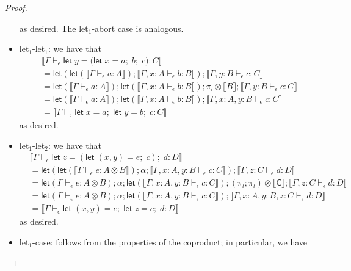 \documentclass[acmsmall,screen,review]{acmart}
\newcommand{\ms}[1]{\ensuremath{\mathsf{#1}}}
\newcommand{\letexpr}[3]{\ensuremath{\ms{let}\;#1 = #2;\;#3}}
\newcommand{\bhyp}[2]{#1 : #2}
\newcommand{\hasty}[4]{#1 \vdash_{#2} #3: {#4}}
\newcommand{\brle}[1]{{\textsf{#1}}}
\newcommand{\dnt}[1]{\llbracket{#1}\rrbracket}
\newcommand{\lmor}[1]{\ms{let}(#1)}
\begin{document}
\begin{proof}
\begin{itemize}[leftmargin=*]
    as desired. The \brle{let$_1$-abort} case is analogous.
    \item \brle{let$_1$-let$_1$}: we have that
    \begin{align*}
      & \dnt{\hasty{\Gamma}{\epsilon}{\letexpr{y}{(\letexpr{x}{a}{b}}{c})}{C}} \\
      & = \lmor{\lmor{\dnt{\hasty{\Gamma}{\epsilon}{a}{A}}} 
        ; \dnt{\hasty{\Gamma, \bhyp{x}{A}}{\epsilon}{b}{B}}}
        ; \dnt{\hasty{\Gamma, \bhyp{y}{B}}{\epsilon}{c}{C}} \\
      & = \lmor{\dnt{\hasty{\Gamma}{\epsilon}{a}{A}}}
        ; \lmor{\dnt{\hasty{\Gamma, \bhyp{x}{A}}{\epsilon}{b}{B}}}
        ; \pi_l \otimes \dnt{B}
        ; \dnt{\hasty{\Gamma, \bhyp{y}{B}}{\epsilon}{c}{C}} \\
      & = \lmor{\dnt{\hasty{\Gamma}{\epsilon}{a}{A}}}
      ; \lmor{\dnt{\hasty{\Gamma, \bhyp{x}{A}}{\epsilon}{b}{B}}}
      ; \dnt{\hasty{\Gamma, \bhyp{x}{A}, \bhyp{y}{B}}{\epsilon}{c}{C}} \\
      & = \dnt{\hasty{\Gamma}{\epsilon}{\letexpr{x}{a}{\letexpr{y}{b}{c}}}{C}}
    \end{align*}
    as desired.
    \item \brle{let$_1$-let$_2$}: we have that
    \begin{align*}
      & \dnt{\hasty{\Gamma}{\epsilon}{\letexpr{z}{(\letexpr{(x, y)}{e}{c})}{d}}{D}} \\
      & = \lmor{\lmor{\dnt{\hasty{\Gamma}{\epsilon}{e}{A \otimes B}}}
          ; \alpha
          ; \dnt{\hasty{\Gamma, \bhyp{x}{A}, \bhyp{y}{B}}{\epsilon}{c}{C}}}
        ; \dnt{\hasty{\Gamma, \bhyp{z}{C}}{\epsilon}{d}{D}} \\
      & = \lmor{\hasty{\Gamma}{\epsilon}{e}{A \otimes B}}
        ; \alpha
        ; \lmor{\dnt{\hasty{\Gamma, \bhyp{x}{A}, \bhyp{y}{B}}{\epsilon}{c}{C}}}
        ; (\pi_l ; \pi_l) \otimes \dnt{\ms{C}}
        ; \dnt{\hasty{\Gamma, \bhyp{z}{C}}{\epsilon}{d}{D}} \\
      & = \lmor{\hasty{\Gamma}{\epsilon}{e}{A \otimes B}}
      ; \alpha
      ; \lmor{\dnt{\hasty{\Gamma, \bhyp{x}{A}, \bhyp{y}{B}}{\epsilon}{c}{C}}}
      ; \dnt{\hasty{\Gamma, \bhyp{x}{A}, \bhyp{y}{B}, \bhyp{z}{C}}{\epsilon}{d}{D}} \\
      & = \dnt{\hasty{\Gamma}{\epsilon}{\letexpr{(x, y)}{e}{\letexpr{z}{c}{d}}}{D}}
    \end{align*}
    as desired.
    \item \brle{let$_1$-case}: follows from the properties of the coproduct; in particular, we have

\end{itemize}
\end{proof}
\end{document}
